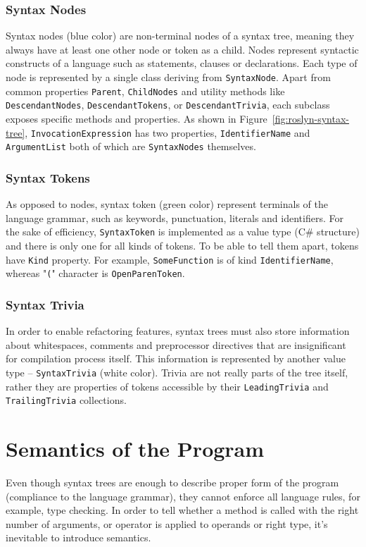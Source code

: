 \documentclass[
  digital, %
  table,   %
  lof,     %
  lot,     %
  oneside,
]{fithesis3}
\begin{document}
\subsubsection{Syntax Nodes}
Syntax nodes (blue color) are non-terminal nodes of a syntax tree, meaning they always have at least one other node or token as a child. Nodes represent syntactic constructs of a language such as statements, clauses or declarations. Each type of node is represented by a single class deriving from \texttt{SyntaxNode}. Apart from common properties \texttt{Parent}, \texttt{ChildNodes} and utility methods like \texttt{DescendantNodes}, \texttt{DescendantTokens}, or \texttt{DescendantTrivia}, each subclass exposes specific methods and properties. As shown in Figure~\ref{fig:roslyn-syntax-tree}, \texttt{InvocationExpression} has two properties, \texttt{IdentifierName} and \texttt{ArgumentList} both of which are \texttt{SyntaxNodes} themselves.
 
\subsubsection{Syntax Tokens}
As opposed to nodes, syntax token (green color) represent terminals of the language grammar, such as keywords, punctuation, literals and identifiers. For the sake of efficiency, \texttt{SyntaxToken} is implemented as a value type (C\# structure) and there is only one for all kinds of tokens. To be able to tell them apart, tokens have \texttt{Kind} property. For example, \texttt{SomeFunction} is of kind \texttt{IdentifierName}, whereas "\texttt{(}" character is \texttt{OpenParenToken}.

\subsubsection{Syntax Trivia}
In order to enable refactoring features, syntax trees must also store information about whitespaces, comments and preprocessor directives that are insignificant for compilation process itself. This information is represented by another value type -- \texttt{SyntaxTrivia} (white color). Trivia are not really parts of the tree itself, rather they are properties of tokens accessible by their \texttt{LeadingTrivia} and \texttt{TrailingTrivia} collections.

\section{Semantics of the Program}
Even though syntax trees are enough to describe proper form of the program (compliance to the language grammar), they cannot enforce all language rules, for example, type checking. In order to tell whether a method is called with the right number of arguments, or operator is applied to operands or right type, it's inevitable to introduce semantics. 
\end{document}
